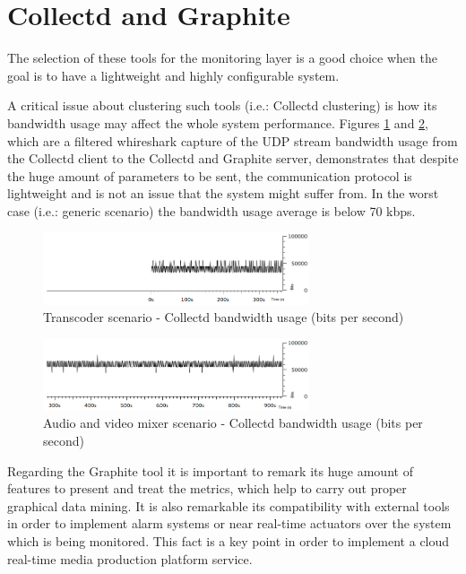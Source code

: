 \section{Collectd and Graphite}

The selection of these tools for the monitoring layer is a good choice when the goal is to have a lightweight and highly configurable system. 

A critical issue about clustering such tools (i.e.: Collectd clustering) is how its bandwidth usage may affect the whole system performance. Figures \ref{F:tscbu} and \ref{F:avmscbu}, which are a filtered whireshark capture of the UDP stream bandwidth usage from the Collectd client to the Collectd and Graphite server, demonstrates that despite the huge amount of parameters to be sent, the communication protocol is lightweight and is not an issue that the system might suffer from. In the worst case (i.e.: generic scenario) the bandwidth usage average is below 70 kbps.

\begin{figure}[!htb]
\begin{center}
\includegraphics[width=0.70\textwidth]{./images/testStats/testStatsDocker/collectdBWbits.png}
\caption{Transcoder scenario - Collectd bandwidth usage (bits per second)}
\label{F:tscbu}
\end{center}
\end{figure}

\begin{figure}[!htb]
\begin{center}
\includegraphics[width=0.70\textwidth]{./images/testAVMix/collectdBWbits.png}
\caption{Audio and video mixer scenario - Collectd bandwidth usage (bits per second)}
\label{F:avmscbu}
\end{center}
\end{figure}

\vbox{Regarding the Graphite tool it is important to remark its huge amount of features to present and treat the metrics, which help to carry out proper graphical data mining. It is also remarkable its compatibility with external tools in order to implement alarm systems or near real-time actuators over the system which is being monitored. This fact is a key point in order to implement a cloud real-time media production platform service.}

